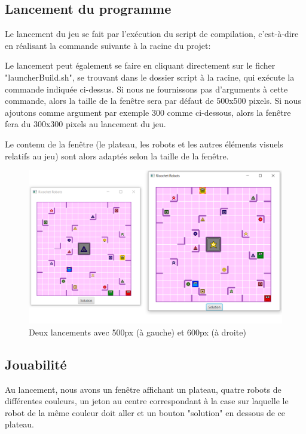 \documentclass[a4paper, 12pt]{article}
\begin{document}
    \subsection{Lancement du programme}
        Le lancement du jeu se fait par l'exécution du script de compilation, c'est-à-dire en réalisant la commande suivante à la racine du projet:
        
        Le lancement peut également se faire en cliquant directement sur le ficher "launcherBuild.sh", se trouvant dans le dossier script à la racine, qui exécute la commande indiquée ci-dessus.
        Si nous ne fournissons pas d'arguments à cette commande, alors la taille de la fenêtre sera par défaut de 500x500 pixels. Si nous ajoutons comme argument par exemple 300 comme ci-dessous, alors la fenêtre fera du 300x300 pixels au lancement du jeu.
        
        
        Le contenu de la fenêtre (le plateau, les robots et les autres éléments visuels relatifs au jeu) sont alors adaptés selon la taille de la fenêtre.
        
        \begin{figure}[H]
            \centering
            \includegraphics[scale=0.5]{images/dimensionDifferente.PNG}
            \caption{Deux lancements avec 500px (à gauche) et 600px (à droite)}
        \end{figure}
        
    \subsection{Jouabilité}
        Au lancement, nous avons un fenêtre affichant un plateau, quatre robots de différentes couleurs, un jeton au centre correspondant à la case sur laquelle le robot de la même couleur doit aller et un bouton "solution" en dessous de ce plateau. 
        
\end{document}
